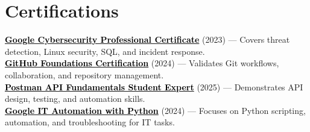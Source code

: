 \documentclass[a4paper]{article}
\begin{document}
\section{Certifications}
 \begin{itemize}[leftmargin=0.15in, label={}]
    \small{\item{
    \href{https://coursera.org/share/44fd8f381cb39ac45892569cdf6f7674}{\textcolor{black}{\textbf{Google Cybersecurity Professional Certificate}}} (2023) — Covers threat detection, Linux security, SQL, and incident response. \\
    \href{https://www.credly.com/badges/d5c30c19-02db-4c5f-9bc9-4bd0f4b6a89e/public_url}{\textcolor{black}{\textbf{GitHub Foundations Certification}}} (2024) — Validates Git workflows, collaboration, and repository management. \\
    \href{https://badges.parchment.com/public/assertions/ZF0yx-i3T1CvXYwDLEUneA?identity__email=sakib.sadman.badhon\%40g.bracu.ac.bd}{\textcolor{black}{\textbf{Postman API Fundamentals Student Expert}}} (2025) — Demonstrates API design, testing, and automation skills. \\
    \href{https://coursera.org/share/2afadc6ce043cc25337eb8c8fe61c9b6}{\textcolor{black}{\textbf{Google IT Automation with Python}}} (2024) — Focuses on Python scripting, automation, and troubleshooting for IT tasks. \\
    }}
 \end{itemize}


\end{document}
